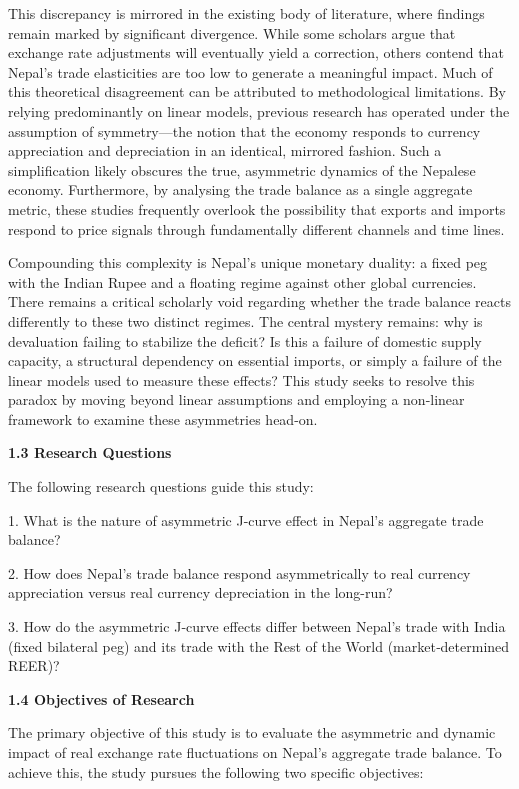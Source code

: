 \documentclass[12pt]{article}
\begin{document}
This discrepancy is mirrored in the existing body of literature, where findings remain marked by significant divergence. While some scholars argue that exchange rate adjustments will eventually yield a correction, others contend that Nepal’s trade elasticities are too low to generate a meaningful impact. Much of this theoretical disagreement can be attributed to methodological limitations. By relying predominantly on linear models, previous research has operated under the assumption of symmetry—the notion that the economy responds to currency appreciation and depreciation in an identical, mirrored fashion. Such a simplification likely obscures the true, asymmetric dynamics of the Nepalese economy. Furthermore, by analysing the trade balance as a single aggregate metric, these studies frequently overlook the possibility that exports and imports respond to price signals through fundamentally different channels and time lines.

Compounding this complexity is Nepal’s unique monetary duality: a fixed peg with the Indian Rupee and a floating regime against other global currencies. There remains a critical scholarly void regarding whether the trade balance reacts differently to these two distinct regimes. The central mystery remains: why is devaluation failing to stabilize the deficit? Is this a failure of domestic supply capacity, a structural dependency on essential imports, or simply a failure of the linear models used to measure these effects? This study seeks to resolve this paradox by moving beyond linear assumptions and employing a non-linear framework to examine these asymmetries head-on.

\vspace{0.5cm}
\noindent\textbf{1.3 Research Questions}

The following research questions guide this study:

1. What is the nature of asymmetric J-curve effect in Nepal's aggregate trade balance?

2. How does Nepal’s trade balance respond asymmetrically to real currency appreciation versus real currency depreciation in the long-run?

3. How do the asymmetric J‑curve effects differ between Nepal's trade with India (fixed bilateral peg) and its trade with the Rest of the World (market‑determined REER)? 

\vspace{0.5cm}
\noindent\textbf{1.4 Objectives of Research}

The primary objective of this study is to evaluate the asymmetric and dynamic impact of real exchange rate fluctuations on Nepal's aggregate trade balance. To achieve this, the study pursues the following two specific objectives:
\end{document}
